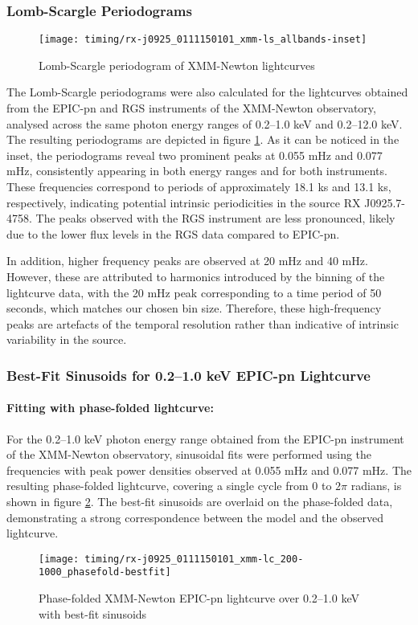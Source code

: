 			\subsubsection{Lomb-Scargle Periodograms}
				\begin{figure}[h!]
					\centering
					\texttt{[image: timing/rx-j0925\_0111150101\_xmm-ls\_allbands-inset]}
					\caption{Lomb-Scargle periodogram of XMM-Newton lightcurves}
					\label{result:ls-mrvel-xmm}
				\end{figure}
				The Lomb-Scargle periodograms were also calculated for the lightcurves obtained from the EPIC-pn and RGS instruments of the XMM-Newton observatory, analysed across the same photon energy ranges of 0.2--1.0 keV and 0.2--12.0 keV. The resulting periodograms are depicted in figure \ref{result:ls-mrvel-xmm}. As it can be noticed in the inset, the periodograms reveal two prominent peaks at 0.055 mHz and 0.077 mHz, consistently appearing in both energy ranges and for both instruments. These frequencies correspond to periods of approximately 18.1 ks and 13.1 ks, respectively, indicating potential intrinsic periodicities in the source RX J0925.7-4758. The peaks observed with the RGS instrument are less pronounced, likely due to the lower flux levels in the RGS data compared to EPIC-pn.
				
				In addition, higher frequency peaks are observed at 20 mHz and 40 mHz. However, these are attributed to harmonics introduced by the binning of the lightcurve data, with the 20 mHz peak corresponding to a time period of 50 seconds, which matches our chosen bin size. Therefore, these high-frequency peaks are artefacts of the temporal resolution rather than indicative of intrinsic variability in the source.
			
			\subsubsection{Best-Fit Sinusoids for 0.2--1.0 keV EPIC-pn Lightcurve}
				\paragraph{Fitting with phase-folded lightcurve:}
				For the 0.2--1.0 keV photon energy range obtained from the EPIC-pn instrument of the XMM-Newton observatory, sinusoidal fits were performed using the frequencies with peak power densities observed at 0.055 mHz and 0.077 mHz. The resulting phase-folded lightcurve, covering a single cycle from 0 to $2\pi$ radians, is shown in figure \ref{result:lc-phase-fold-mrvel-xmm:200-1000-bestfit}. The best-fit sinusoids are overlaid on the phase-folded data, demonstrating a strong correspondence between the model and the observed lightcurve.
				\newpage
				\begin{figure}[h!]
					\centering
					\texttt{[image: timing/rx-j0925\_0111150101\_xmm-lc\_200-1000\_phasefold-bestfit]}
					\caption{Phase-folded XMM-Newton EPIC-pn lightcurve over 0.2--1.0 keV with best-fit sinusoids}
					\label{result:lc-phase-fold-mrvel-xmm:200-1000-bestfit}
				\end{figure}
				
